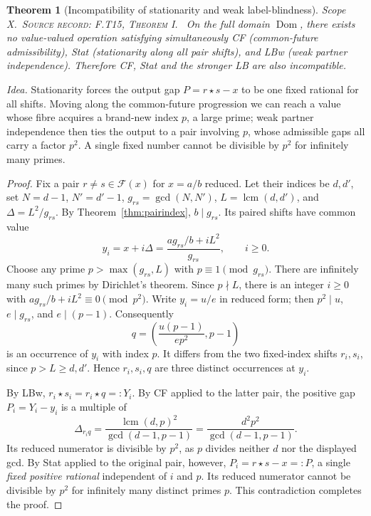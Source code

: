 \documentclass[11pt,oneside,openany]{book}
\newtheorem{theorem}{Theorem}[chapter]
\theoremstyle{definition}
\theoremstyle{remark}
\newcommand{\Fx}{\mathcal{F}}
\newcommand{\lcmop}{\operatorname{lcm}}
\newcommand{\gcdop}{\operatorname{gcd}}
\newcommand{\scope}[1]{\textsf{\small Scope #1.}\ }
\newcommand{\record}[1]{\textup{\textsc{Source record: #1.}}\ }
\newcommand{\Del}{\Delta}
\begin{document}
\begin{theorem}[Incompatibility of stationarity and weak label-blindness]\label{thm:incompat}
\scope{X}\record{F.T15, Theorem I} On the full domain \(\operatorname{Dom}\), there exists no value-valued operation satisfying simultaneously CF (common-future admissibility), Stat (stationarity along all pair shifts), and LBw (weak partner independence). Therefore CF, Stat and the stronger LB are also incompatible.
\end{theorem}
\emph{Idea.} Stationarity forces the output gap \(P=r\star s-x\) to be one fixed rational for all shifts. Moving along the common-future progression we can reach a value whose fibre acquires a brand-new index \(p\), a large prime; weak partner independence then ties the output to a pair involving \(p\), whose admissible gaps all carry a factor \(p^2\). A single fixed number cannot be divisible by \(p^2\) for infinitely many primes.
\begin{proof}
Fix a pair \(r\ne s\in\Fx(x)\) for \(x=a/b\) reduced. Let their indices be \(d,d'\), set \(N=d-1\), \(N'=d'-1\), \(g_{rs}=\gcdop(N,N')\), \(L=\lcmop(d,d')\), and \(\Del=L^2/g_{rs}\). By Theorem~\ref{thm:pairindex}, \(b\mid g_{rs}\). Its paired shifts have common value
\[
 y_i=x+i\Del=\frac{a g_{rs}/b+iL^2}{g_{rs}},\qquad i\ge0.
\]
Choose any prime \(p>\max(g_{rs},L)\) with \(p\equiv1\pmod{g_{rs}}\). There are infinitely many such primes by Dirichlet's theorem. Since \(p\nmid L\), there is an integer \(i\ge0\) with \(a g_{rs}/b+iL^2\equiv0\pmod{p^2}\). Write \(y_i=u/e\) in reduced form; then \(p^2\mid u\), \(e\mid g_{rs}\), and \(e\mid(p-1)\). Consequently
\[
 q=\left(\frac{u(p-1)}{e p^2},p-1\right)
\]
is an occurrence of \(y_i\) with index \(p\). It differs from the two fixed-index shifts \(r_i,s_i\), since \(p>L\ge d,d'\). Hence \(r_i,s_i,q\) are three distinct occurrences at \(y_i\).

By LBw, \(r_i\star s_i=r_i\star q=:Y_i\). By CF applied to the latter pair, the positive gap \(P_i=Y_i-y_i\) is a multiple of
\[
 \Del_{r_iq}=\frac{\lcmop(d,p)^2}{\gcdop(d-1,p-1)}
 =\frac{d^2p^2}{\gcdop(d-1,p-1)}.
\]
Its reduced numerator is divisible by \(p^2\), as \(p\) divides neither \(d\) nor the displayed gcd. By Stat applied to the original pair, however, \(P_i=r\star s-x=:P\), a single \emph{fixed positive rational} independent of \(i\) and \(p\). Its reduced numerator cannot be divisible by \(p^2\) for infinitely many distinct primes \(p\). This contradiction completes the proof.
\end{proof}
\end{document}
